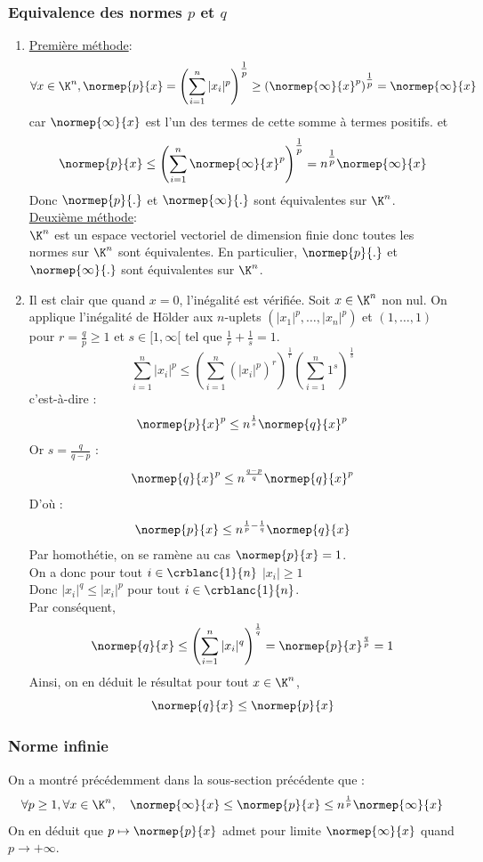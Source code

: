 \documentclass{book}
\begin{document}
	\subsubsection{Equivalence des normes $p$ et $q$}
	\begin{enumerate}
		\item 
		\underline{Première méthode}:\\
		\[\forall x\in\K^n, \normep{p}{x}=\left(\sum_{i=1}^{n}|x_i|^p\right)^{\tfrac{1}{p}}\geq (\normep{\infty}{x}^p)^{\tfrac{1}{p}}=\normep{\infty}{x}\]
		car $\normep{\infty}{x}$ est l'un des termes de cette somme à termes positifs.
		et \[ \normep{p}{x}\leq\left(\sum_{i=1}^{n}\normep{\infty}{x}^p\right)^{\tfrac{1}{p}}=n^{\tfrac{1}{p}}\normep{\infty}{x}\]
		Donc $\normep{p}{.}$ et $\normep{\infty}{.}$ sont équivalentes sur $\K^n$. \\
		\underline{Deuxième méthode}:\\
		$\K^n$ est un espace vectoriel vectoriel de dimension finie donc toutes les normes sur $\K^n$ sont équivalentes. En particulier, $\normep{p}{.}$ et $\normep{\infty}{.}$ sont équivalentes sur $\K^n$.
		\item 
		Il est clair que quand $x=0$, l'inégalité est vérifiée.
		Soit $x\in\K^n$ non nul.
		On applique l'inégalité de Hölder aux $n$-uplets $(|x_1|^p,\dots,|x_n|^p)$ et $(1,\dots,1)$ pour $r=\frac{q}{p}\geq 1$ et $s\in[1,\infty[$ tel que $\frac{1}{r}+\frac{1}{s}=1$. 
		\[
		\sum_{i=1}^{n}|x_i|^p\leq\left(\sum_{i=1}^{n}(|x_i|^p)^r\right)^{\frac{1}{r}}\left(\sum_{i=1}^{n}1^s\right)^{\frac{1}{s}}
		\]
		c'est-à-dire :\[
		\normep{p}{x}^p\leq n^{\frac{1}{s}}\normep{q}{x}^p
		\]
		Or $s=\frac{q}{q-p}$ :
		\[
		\normep{q}{x}^p\leq n^{\frac{q-p}{q}}\normep{q}{x}^p
		\]
		D'où :\[ \normep{p}{x}\leq n^{\frac{1}{p}-\frac{1}{q}}\normep{q}{x}\]
		Par homothétie, on se ramène au cas $\normep{p}{x}=1$.\\
		On a donc pour tout $i\in\crblanc{1}{n}$ $|x_i|\geq 1$\\
		Donc $|x_i|^q\leq |x_i|^p$ pour tout $i\in\crblanc{1}{n}$.\\
		Par conséquent, \[\normep{q}{x}\leq\left(\sum_{i=1}^{n}|x_i|^q\right)^{\frac{1}{q}}=\normep{p}{x}^{\frac{q}{p}}=1\]
		Ainsi, on en déduit le résultat pour tout $x\in\K^n$, \[\normep{q}{x}\leq\normep{p}{x}\]
	\end{enumerate}
	\subsubsection{Norme infinie}
	On a montré précédemment dans la sous-section précédente que : \[\forall p\geq 1, \forall x\in \K^n,\quad \normep{\infty}{x}\leq\normep{p}{x}\leq n^{\frac{1}{p}}\normep{\infty}{x}\]
	On en déduit que $p\mapsto\normep{p}{x}$ admet pour limite $\normep{\infty}{x}$ quand $p\to+\infty$.
	
\end{document}
